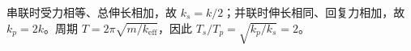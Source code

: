 串联时受力相等、总伸长相加，故 $k_s=k/2$；并联时伸长相同、回复力相加，故 $k_p=2k$。周期 $T=2\pi\sqrt{m/k_{\mathrm{eff}}}$，因此 $T_s/T_p=\sqrt{k_p/k_s}=2$。
